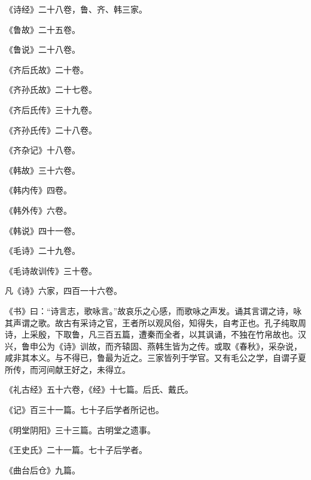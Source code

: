 \documentclass[12pt,UTF8]{ctexbook}
\begin{document}
《诗经》二十八卷，鲁、齐、韩三家。



《鲁故》二十五卷。



《鲁说》二十八卷。



《齐后氏故》二十卷。



《齐孙氏故》二十七卷。



《齐后氏传》三十九卷。



《齐孙氏传》二十八卷。



《齐杂记》十八卷。



《韩故》三十六卷。



《韩内传》四卷。



《韩外传》六卷。



《韩说》四十一卷。



《毛诗》二十九卷。



《毛诗故训传》三十卷。



凡《诗》六家，四百一十六卷。



《书》曰：“诗言志，歌咏言。”故哀乐之心感，而歌咏之声发。诵其言谓之诗，咏其声谓之歌。故古有采诗之官，王者所以观风俗，知得失，自考正也。孔子纯取周诗，上采殷，下取鲁，凡三百五篇，遭秦而全者，以其讽诵，不独在竹帛故也。汉兴，鲁申公为《诗》训故，而齐辕固、燕韩生皆为之传。或取《春秋》，采杂说，咸非其本义。与不得已，鲁最为近之。三家皆列于学官。又有毛公之学，自谓子夏所传，而河间献王好之，未得立。



《礼古经》五十六卷，《经》十七篇。后氏、戴氏。



《记》百三十一篇。七十子后学者所记也。



《明堂阴阳》三十三篇。古明堂之遗事。



《王史氏》二十一篇。七十子后学者。



《曲台后仓》九篇。
\end{document}

